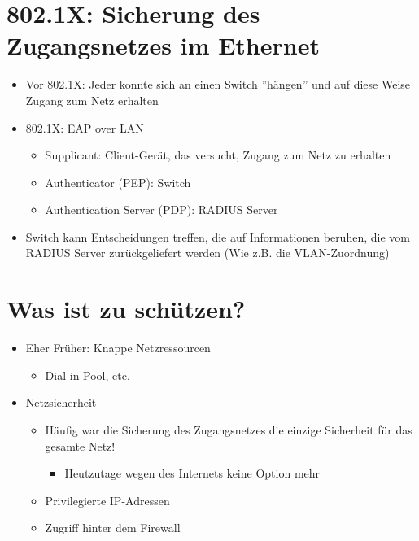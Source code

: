 \documentclass[openany]{book}
\begin{document}
\section{802.1X: Sicherung des Zugangsnetzes im Ethernet}

\begin{itemize}
    \item Vor 802.1X: Jeder konnte sich an einen Switch ''hängen'' und auf diese Weise Zugang zum Netz erhalten
    \item 802.1X: EAP over LAN
    \begin{itemize}
        \item Supplicant: Client-Gerät, das versucht, Zugang zum Netz zu erhalten
        \item Authenticator (PEP): Switch
        \item Authentication Server (PDP): RADIUS Server
    \end{itemize}
    \item Switch kann Entscheidungen treffen, die auf Informationen beruhen, die vom RADIUS Server zurückgeliefert werden (Wie z.B. die VLAN-Zuordnung)
\end{itemize}

\section{Was ist zu schützen?}

\begin{itemize}
    \item Eher Früher: Knappe Netzressourcen
    \begin{itemize}
        \item Dial-in Pool, etc.
    \end{itemize}
    \item Netzsicherheit
    \begin{itemize}
        \item Häufig war die Sicherung des Zugangsnetzes die einzige Sicherheit für das gesamte Netz!
        \begin{itemize}
            \item Heutzutage wegen des Internets keine Option mehr
        \end{itemize}
        \item Privilegierte IP-Adressen
        \item Zugriff hinter dem Firewall 
    \end{itemize}
\end{itemize}
\end{document}
